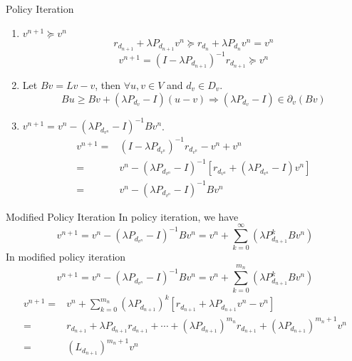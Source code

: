 \documentclass{beamer}
\begin{document}
\begin{frame}[shrink]{Policy Iteration}
    \begin{enumerate}
        \item $ v^{n+1} \succeq v^{n} $
                \[
                   r_{d_{n+1}} + \lambda P _{d_{n+1}}v^n \succeq r_{d_n} + \lambda P_{d_{n}} v^n = v^n
                \]
                \[
                    v^{n+1} = {(I - \lambda P_{d_{n+1}})}^{-1} r_{d_{n+1}} \succeq v^{n}
                \]
        \item Let $ Bv = Lv - v $, then $ \forall u,v \in V $ and $ d_v \in D_v $.
            \[
                Bu \ge Bv + (\lambda P_{d_{v}} - I)(u-v) \Rightarrow
                (\lambda P_{d_{v}} - I) \in \partial_{v} (Bv)
            \]
        \item $ v^{n+1} = v^n - {(\lambda P _{d_{v^{n}}} - I) }^{-1} B v^{n} $.
            \begin{align*}
                v^{n+1} =& {(I - \lambda P_{d_{v^n}})}^{-1} r_{d_{v^{n}}} - v^n + v^n\\
                =& v^n - {(\lambda P_{d_{v^n}} - I)}^{-1} \left[ r_{d_{v^{n}}} +  {(\lambda P_{d_{v^n}} - I)}v^n \right]\\
                =& v^n - {(\lambda P _{d_{v^{n}}} - I) }^{-1} B v^{n}
            \end{align*}
    \end{enumerate}
\end{frame}

\begin{frame}[shrink]{Modified Policy Iteration}
    In policy iteration, we have
    \[
        v^{n+1} = v^n - {(\lambda P _{d_{v^{n}}} - I) }^{-1} B v^{n} = v^n + \sum^{\infty}_{k = 0} {\left( \lambda P_{d_{n+1}}^k B v^n \right)}
    \]    
    In modified policy iteration
    \[
        v^{n+1} = v^n - {(\lambda P _{d_{v^{n}}} - I) }^{-1} B v^{n} = v^n + \sum^{m_n}_{k = 0} {\left( \lambda P_{d_{n+1}}^k B v^n \right)}
    \]    
    \begin{align*}
            v^{n+1} =& v^n + \sum^{m_n}_{k=0} {\left( \lambda P_{d_{n+1}} \right)}^k \left[ r_{d_{n+1}} + \lambda P_{d_{n+1}} v^n - v^n \right]\\
            =& r_{d_{n+1}} + \lambda P_{d_{n+1}}r_{d_{n+1}} + \cdots + {\left(\lambda P_{d_{n+1}}\right)}^{m_n}r_{d_{n+1}} + {\left( \lambda P_{d_{n+1}} \right)}^{m_n + 1} v^n\\
            =& {(L_{d_{n+1}})}^{m_n+1}v^n
    \end{align*}
\end{frame}
\end{document}
